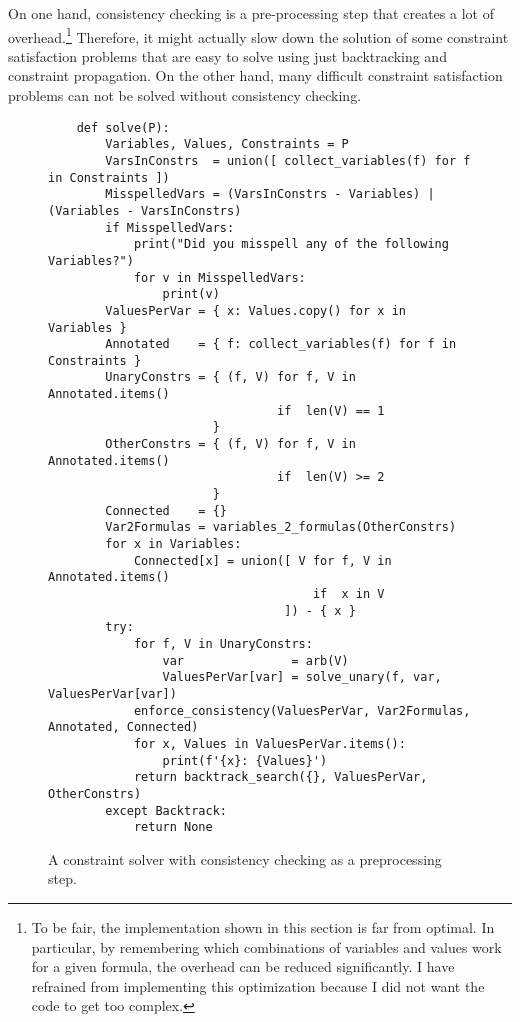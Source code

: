 On one hand, consistency checking is a pre-processing step that creates a lot of overhead.\footnote{
  To be fair, the implementation shown in this section is far from optimal.  In particular, by remembering which
  combinations of variables and values work for a given formula, the overhead can be reduced significantly.  I have
  refrained from implementing this optimization because I did not want the code to get too complex.
}
Therefore, it might actually slow down the
solution of some constraint satisfaction problems that are easy to solve using just backtracking and
constraint propagation.  On the other hand, many difficult constraint satisfaction problems can not be solved
without consistency checking. 


\begin{figure}[!ht]
\centering
\begin{verbatim}
    def solve(P):
        Variables, Values, Constraints = P
        VarsInConstrs  = union([ collect_variables(f) for f in Constraints ])
        MisspelledVars = (VarsInConstrs - Variables) | (Variables - VarsInConstrs)
        if MisspelledVars:
            print("Did you misspell any of the following Variables?")
            for v in MisspelledVars:
                print(v)
        ValuesPerVar = { x: Values.copy() for x in Variables }
        Annotated    = { f: collect_variables(f) for f in Constraints }
        UnaryConstrs = { (f, V) for f, V in Annotated.items() 
                                if  len(V) == 1 
                       }
        OtherConstrs = { (f, V) for f, V in Annotated.items() 
                                if  len(V) >= 2 
                       }
        Connected    = {}
        Var2Formulas = variables_2_formulas(OtherConstrs)
        for x in Variables:
            Connected[x] = union([ V for f, V in Annotated.items() 
                                     if  x in V 
                                 ]) - { x }
        try:
            for f, V in UnaryConstrs:
                var               = arb(V)
                ValuesPerVar[var] = solve_unary(f, var, ValuesPerVar[var])
            enforce_consistency(ValuesPerVar, Var2Formulas, Annotated, Connected)
            for x, Values in ValuesPerVar.items():
                print(f'{x}: {Values}')
            return backtrack_search({}, ValuesPerVar, OtherConstrs)
        except Backtrack:
            return None
\end{verbatim}
\vspace*{-0.3cm}
\caption{A constraint solver with consistency checking as a preprocessing step.}
\label{fig:Consistency-Solver.ipynb:solve}
\end{figure}


